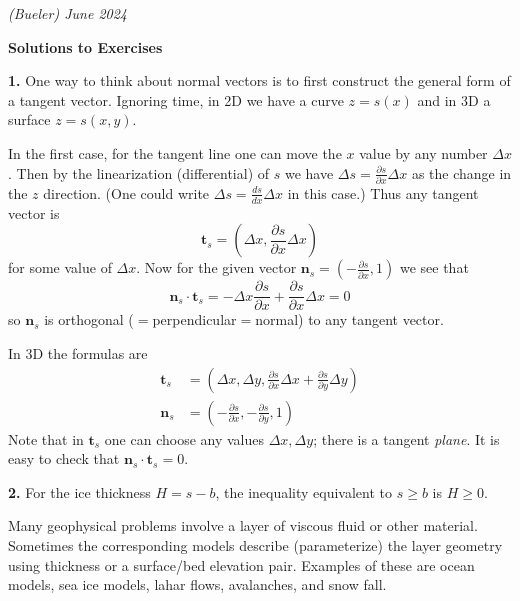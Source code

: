 \documentclass[12pt]{amsart}
\newcommand{\bn}{\mathbf{n}}
\newcommand{\bt}{\mathbf{t}}
\newcommand{\prob}[1]{\bigskip\noindent\textbf{#1.}\quad }
\begin{document}
\scriptsize \hfill \emph{(Bueler) June 2024}
\normalsize\medskip

\Large\centerline{\textbf{Solutions to Exercises}}

\normalsize
\prob{1}  One way to think about normal vectors is to first construct the general form of a tangent vector.  Ignoring time, in 2D we have a curve $z=s(x)$ and in 3D a surface $z=s(x,y)$.

In the first case, for the tangent line one can move the $x$ value by any number $\Delta x$.  Then by the linearization (differential) of $s$ we have $\Delta s= \frac{\partial s}{\partial x} \Delta x$ as the change in the $z$ direction.  (One could write $\Delta s= \frac{ds}{dx} \Delta x$ in this case.)  Thus any tangent vector is
	$$\bt_s = \left(\Delta x, \frac{\partial s}{\partial x} \Delta x\right)$$
for some value of $\Delta x$.  Now for the given vector $\bn_s = (-\frac{\partial s}{\partial x},1)$ we see that
	$$\bn_s \cdot \bt_s = -\Delta x \frac{\partial s}{\partial x} + \frac{\partial s}{\partial x} \Delta x = 0$$
so $\bn_s$ is orthogonal ($=$perpendicular$=$normal) to any tangent vector.

In 3D the formulas are
\begin{align*}
\bt_s &= \left(\Delta x, \Delta y, \frac{\partial s}{\partial x} \Delta x + \frac{\partial s}{\partial y} \Delta y\right) \\
\bn_s &= \left(-\frac{\partial s}{\partial x},-\frac{\partial s}{\partial y},1\right)
\end{align*}
Note that in $\bt_s$ one can choose any values $\Delta x,\Delta y$; there is a tangent \emph{plane}.  It is easy to check that $\bn_s \cdot \bt_s = 0$.

\prob{2}  For the ice thickness $H=s-b$, the inequality equivalent to $s\ge b$ is $H\ge 0$.

Many geophysical problems involve a layer of viscous fluid or other material.  Sometimes the corresponding models describe (parameterize) the layer geometry using thickness or a surface/bed elevation pair.  Examples of these are ocean models, sea ice models, lahar flows, avalanches, and snow fall.
\end{document}

